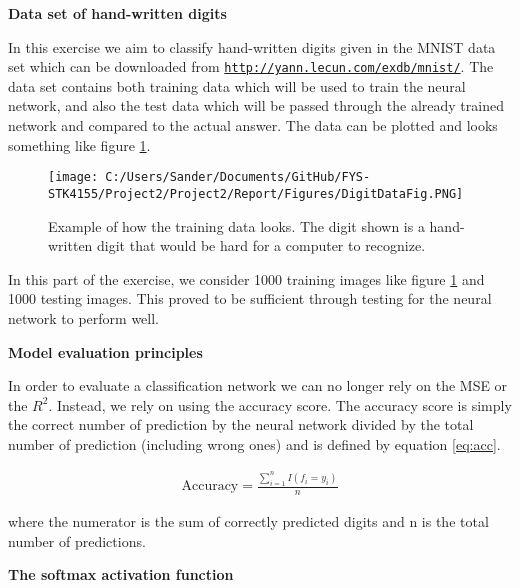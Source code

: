 \documentclass[12pt,a4paper]{article}
\begin{document}
\begin{center}
\large{\textbf{Data set of hand-written digits}}
\end{center}

\noindent In this exercise we aim to classify hand-written digits given in the MNIST data set which can be downloaded from \href{{http://yann.lecun.com/exdb/mnist/}}{\nolinkurl{http://yann.lecun.com/exdb/mnist/}}. The data set contains both training data which will be used to train the neural network, and also the test data which will be passed through the already trained network and compared to the actual answer. The data can be plotted and looks something like figure \ref{fig:DigitDataFig}.

\begin{figure}[H]
\centering
\texttt{[image: C:/Users/Sander/Documents/GitHub/FYS-STK4155/Project2/Project2/Report/Figures/DigitDataFig.PNG]}
\caption{\label{fig:DigitDataFig} Example of how the training data looks. The digit shown is a hand-written digit that would be hard for a computer to recognize.}
\end{figure}

\noindent In this part of the exercise, we consider 1000 training images like figure \ref{fig:DigitDataFig} and 1000 testing images. This proved to be sufficient through testing for the neural network to perform well.

\begin{center}
\large{\textbf{Model evaluation principles}}
\end{center}

\noindent In order to evaluate a classification network we can no longer rely on the MSE or the $R^2$. Instead, we rely on using the accuracy score. The accuracy score is simply the correct number of prediction by the neural network divided by the total number of prediction (including wrong ones) and is defined by equation \ref{eq:acc}.

\begin{equation}\label{eq:acc}
\begin{aligned}
\textrm{Accuracy} = \frac{\sum_{i = 1}^n I(f_i = y_i)}{n}
\end{aligned}
\end{equation}

\noindent where the numerator is the sum of correctly predicted digits and n is the total number of predictions. 

\begin{center}
\large{\textbf{The softmax activation function}}
\end{center}
\end{document}
